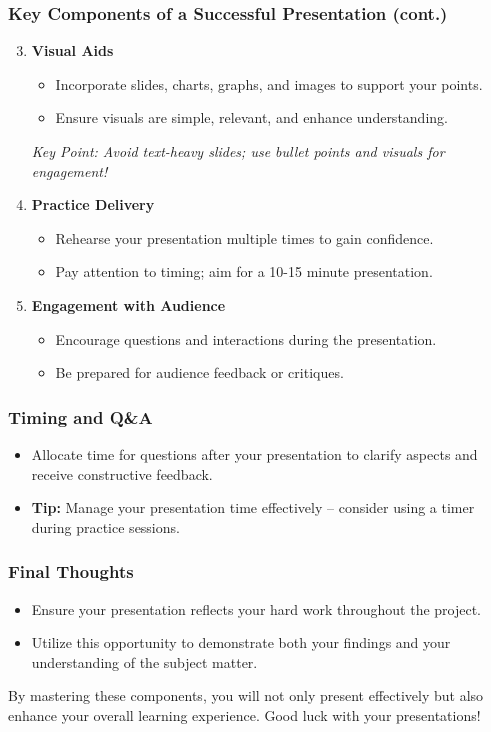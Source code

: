 \documentclass[aspectratio=169]{beamer}
\begin{document}
\begin{frame}[fragile]
  \frametitle{Key Components of a Successful Presentation (cont.)}
  \begin{enumerate}
    \setcounter{enumii}{2} %
    \item \textbf{Visual Aids}
      \begin{itemize}
        \item Incorporate slides, charts, graphs, and images to support your points.
        \item Ensure visuals are simple, relevant, and enhance understanding.
      \end{itemize}
      \textit{Key Point: Avoid text-heavy slides; use bullet points and visuals for engagement!}

    \item \textbf{Practice Delivery}
      \begin{itemize}
        \item Rehearse your presentation multiple times to gain confidence.
        \item Pay attention to timing; aim for a 10-15 minute presentation.
      \end{itemize}
    
    \item \textbf{Engagement with Audience}
      \begin{itemize}
        \item Encourage questions and interactions during the presentation.
        \item Be prepared for audience feedback or critiques.
      \end{itemize}
  \end{enumerate}
\end{frame}

\begin{frame}[fragile]
  \frametitle{Timing and Q\&A}
  \begin{itemize}
    \item Allocate time for questions after your presentation to clarify aspects and receive constructive feedback.
    \item \textbf{Tip:} Manage your presentation time effectively – consider using a timer during practice sessions.
  \end{itemize}
\end{frame}

\begin{frame}[fragile]
  \frametitle{Final Thoughts}
  \begin{itemize}
    \item Ensure your presentation reflects your hard work throughout the project.
    \item Utilize this opportunity to demonstrate both your findings and your understanding of the subject matter.
  \end{itemize}
  By mastering these components, you will not only present effectively but also enhance your overall learning experience. Good luck with your presentations!
\end{frame}
\end{document}
